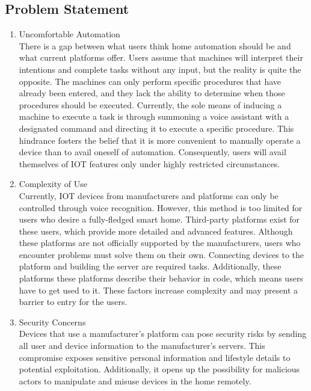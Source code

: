 \subsection {\large{Problem Statement}}
\begin{enumerate}[label=\alph*]
    \item Uncomfortable Automation\\
          There is a gap between what users think home automation should be and what current platforms offer. Users assume that machines will interpret their intentions and complete tasks without any input, but the reality is quite the opposite. The machines can only perform specific procedures that have already been entered, and they lack the ability to determine when those procedures should be executed. Currently, the sole means of inducing a machine to execute a task is through summoning a voice assistant with a designated command and directing it to execute a specific procedure. This hindrance fosters the belief that it is more convenient to manually operate a device than to avail oneself of automation. Consequently, users will avail themselves of IOT features only under highly restricted circumstances.\\

    \item Complexity of Use\\
          Currently, IOT devices from manufacturers and platforms can only be controlled through voice recognition. However, this method is too limited for users who desire a fully-fledged smart home. Third-party platforms exist for these users, which provide more detailed and advanced features. Although these platforms are not officially supported by the manufacturers, users who encounter problems must solve them on their own. Connecting devices to the platform and building the server are required tasks. Additionally, these platforms these platforms describe their behavior in code, which means users have to get used to it. These factors increase complexity and may present a barrier to entry for the users.\\

    \item Security Concerns\\
          Devices that use a manufacturer's platform can pose security risks by sending all user and device information to the manufacturer's servers. This compromise exposes sensitive personal information and lifestyle details to potential exploitation. Additionally, it opens up the possibility for malicious actors to manipulate and misuse devices in the home remotely.\\


\end{enumerate}
